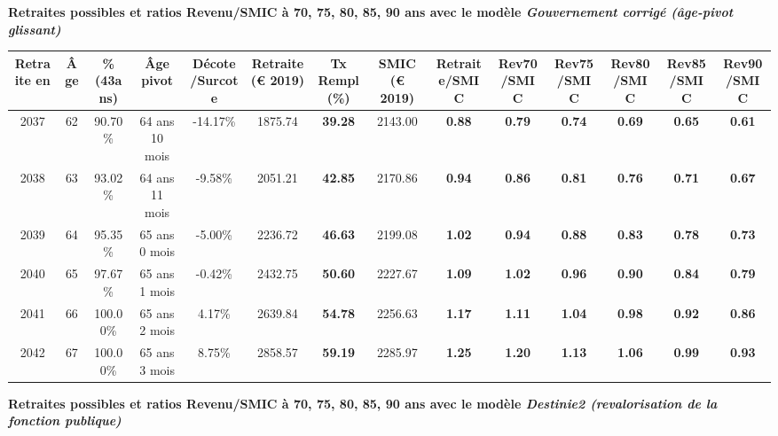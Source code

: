  \vspace{0.1cm} 
{\bf \noindent Retraites possibles et ratios Revenu/SMIC à 70, 75, 80, 85, 90 ans avec le modèle \emph{Gouvernement corrigé (âge-pivot glissant)}}  
 
\begin{adjustbox}{max width=\textwidth} 
\begin{tabular}[htb]{|c|c||c|c|c||c|c||c||c|c|c|c|c|c|} 
\hline 
 Retraite en &  Âge &  \%(43ans) &  Âge pivot &  Décote/Surcote &  Retraite (\euro{} 2019) &  Tx Rempl(\%) &  SMIC (\euro{} 2019) &  Retraite/SMIC &  Rev70/SMIC &  Rev75/SMIC &  Rev80/SMIC &  Rev85/SMIC &  Rev90/SMIC \\ 
\hline \hline 
 2037 &  62 &  90.70\% &  64 ans 10 mois &  -14.17\% &  1875.74 &  {\bf 39.28} &  2143.00 &  {\bf {\color{red} 0.88}} &  {\bf {\color{red} 0.79}} &  {\bf {\color{red} 0.74}} &  {\bf {\color{red} 0.69}} &  {\bf {\color{red} 0.65}} &  {\bf {\color{red} 0.61}} \\ 
\hline 
 2038 &  63 &  93.02\% &  64 ans 11 mois &  -9.58\% &  2051.21 &  {\bf 42.85} &  2170.86 &  {\bf {\color{red} 0.94}} &  {\bf {\color{red} 0.86}} &  {\bf {\color{red} 0.81}} &  {\bf {\color{red} 0.76}} &  {\bf {\color{red} 0.71}} &  {\bf {\color{red} 0.67}} \\ 
\hline 
 2039 &  64 &  95.35\% &  65 ans 0 mois &  -5.00\% &  2236.72 &  {\bf 46.63} &  2199.08 &  {\bf 1.02} &  {\bf {\color{red} 0.94}} &  {\bf {\color{red} 0.88}} &  {\bf {\color{red} 0.83}} &  {\bf {\color{red} 0.78}} &  {\bf {\color{red} 0.73}} \\ 
\hline 
 2040 &  65 &  97.67\% &  65 ans 1 mois &  -0.42\% &  2432.75 &  {\bf 50.60} &  2227.67 &  {\bf 1.09} &  {\bf 1.02} &  {\bf {\color{red} 0.96}} &  {\bf {\color{red} 0.90}} &  {\bf {\color{red} 0.84}} &  {\bf {\color{red} 0.79}} \\ 
\hline 
 2041 &  66 &  100.00\% &  65 ans 2 mois &  4.17\% &  2639.84 &  {\bf 54.78} &  2256.63 &  {\bf 1.17} &  {\bf 1.11} &  {\bf 1.04} &  {\bf {\color{red} 0.98}} &  {\bf {\color{red} 0.92}} &  {\bf {\color{red} 0.86}} \\ 
\hline 
 2042 &  67 &  100.00\% &  65 ans 3 mois &  8.75\% &  2858.57 &  {\bf 59.19} &  2285.97 &  {\bf 1.25} &  {\bf 1.20} &  {\bf 1.13} &  {\bf 1.06} &  {\bf {\color{red} 0.99}} &  {\bf {\color{red} 0.93}} \\ 
\hline 
\hline 
\end{tabular} 
\end{adjustbox} 
 
 \vspace{0.1cm} 
{\bf \noindent Retraites possibles et ratios Revenu/SMIC à 70, 75, 80, 85, 90 ans avec le modèle \emph{Destinie2 (revalorisation de la fonction publique)}}  
 
